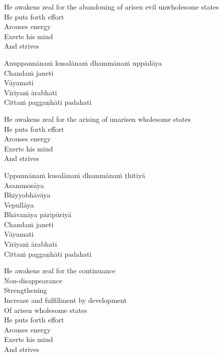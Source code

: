 \begin{english-verses}
  He awakens zeal for the abandoning of arisen evil unwholesome states\\
  He puts forth effort\\
  Arouses energy\\
  Exerts his mind\\
  And strives
\end{english-verses}

Anuppannānaṁ kusalānaṁ dhammānaṁ uppādāya\\
Chandaṁ janeti\\
Vāyamati\\
Vīriyaṁ ārabhati\\
Cittaṁ paggaṇhāti padahati

\begin{english-verses}
  He awakens zeal for the arising of unarisen wholesome states\\
  He puts forth effort\\
  Arouses energy\\
  Exerts his mind\\
  And strives
\end{english-verses}

Uppannānaṁ kusalānaṁ dhammānaṁ ṭhitiyā\\
Asammosāya\\
Bhiyyobhāvāya\\
Vepullāya\\
Bhāvanāya pāripūriyā\\
Chandaṁ janeti\\
Vāyamati\\
Vīriyaṁ ārabhati\\
Cittaṁ paggaṇhāti padahati

  \ifbfiveversion\clearpage\fi

\begin{english-verses}
  He awakens zeal for the continuance\\
  Non-disappearance\\
  Strengthening\\
  Increase and fulfillment by development\\
  Of arisen wholesome states\\
  He puts forth effort\\
  Arouses energy\\
  Exerts his mind\\
  And strives
\end{english-verses}

